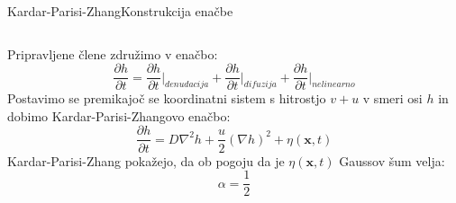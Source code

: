 \documentclass{beamer}
\begin{document}
\begin{frame}{Kardar-Parisi-Zhang}{Konstrukcija enačbe}
\begin{columns}
\begin{column}{0.55\textwidth}
    Pripravljene člene združimo v enačbo:
\begin{equation} \frac{\partial h}{\partial t} = \frac{\partial h}{\partial t} \bigg|_{denudacija} + \frac{\partial h}{\partial t} \bigg|_{difuzija} + \frac{\partial h}{\partial t} \bigg|_{nelinearno} \end{equation}
    Postavimo se premikajoč se koordinatni sistem s hitrostjo $v + u$ v smeri osi $h$ in dobimo Kardar-Parisi-Zhangovo enačbo:
    \begin{equation} \frac{\partial h}{\partial t} = D \nabla^2 h + \frac{u}{2} (\nabla h)^2 + \eta (\mathbf{x},t) \end{equation}
    \newline
    Kardar-Parisi-Zhang pokažejo, da ob pogoju da je $\eta(\mathbf{x},t)$ Gaussov šum velja:
    \begin{equation} \alpha = \frac{1}{2} \end{equation}
  \end{column}
\end{columns}

\end{frame}
\end{document}
